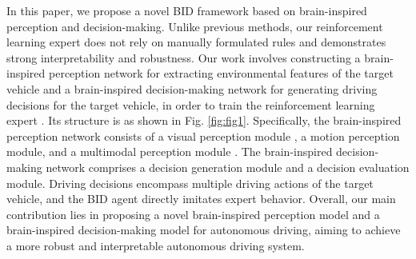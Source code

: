 In this paper, we propose a novel BID framework based on brain-inspired perception and decision-making. Unlike previous methods, our reinforcement learning expert does not rely on manually formulated rules and demonstrates strong interpretability and robustness. Our work involves constructing a brain-inspired perception network for extracting environmental features of the target vehicle and a brain-inspired decision-making network for generating driving decisions for the target vehicle, in order to train the reinforcement learning expert \cite{kahn2021land}. Its structure is as shown in Fig. \ref{fig:fig1}. Specifically, the brain-inspired perception network consists of a visual perception module \cite{al2018brain}, a motion perception module, and a multimodal perception module \cite{yu2023brain}. The brain-inspired decision-making network comprises a decision generation module \cite{schirner2023learning} and a decision evaluation module. Driving decisions encompass multiple driving actions of the target vehicle, and the BID agent directly imitates expert behavior. Overall, our main contribution lies in proposing a novel brain-inspired perception model and a brain-inspired decision-making model for autonomous driving, aiming to achieve a more robust and interpretable autonomous driving system.